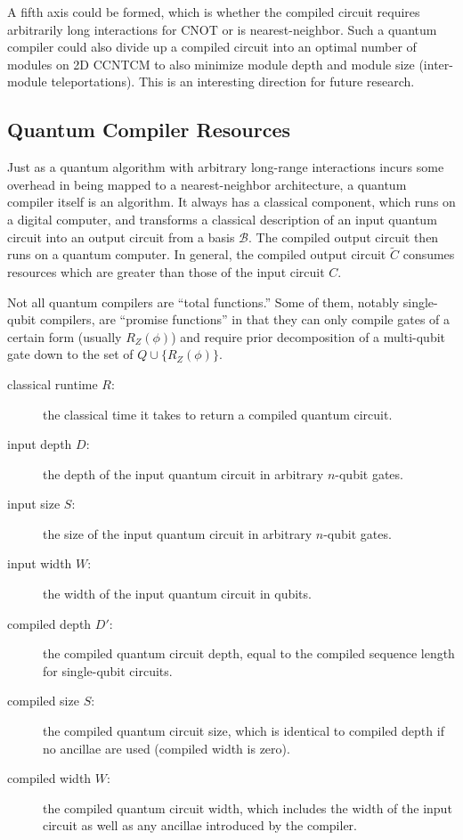 A fifth axis could be formed, which is whether the compiled circuit requires
arbitrarily long interactions for CNOT or is nearest-neighbor. Such a
quantum compiler could also divide up a compiled circuit into an optimal
number of modules on \textsf{2D CCNTCM} to also minimize module depth and
module size (inter-module teleportations). This is an interesting direction
for future research.

\subsection{Quantum Compiler Resources}

Just as a quantum algorithm with arbitrary long-range interactions incurs
some overhead in being mapped to a nearest-neighbor architecture,
a quantum compiler itself is an algorithm. It always has a classical
component, which runs on a digital computer, and transforms a classical
description of an input quantum circuit into an output circuit from
a basis $\mathcal{B}$. The compiled output circuit then runs on a
quantum computer. In general, the compiled output circuit $\tilde{C}$ consumes
resources which are greater than those of the input circuit $C$.

Not all quantum compilers are ``total functions.'' Some of them, notably
single-qubit compilers, are ``promise functions'' in that they can
only compile gates of a certain form (usually $R_Z(\phi)$) and require
prior decomposition of a multi-qubit gate down to the set of
$Q \cup \{R_Z(\phi)\}$.

\begin{description}
\item[classical runtime $R$:] the classical time it takes to return a 
compiled quantum circuit.
\item[input depth $D$:] the depth of the input quantum circuit in arbitrary
$n$-qubit gates.
\item[input size $S$:] the size of the input quantum circuit in arbitrary
$n$-qubit gates.
\item[input width $W$:] the width of the input quantum circuit in qubits.
\item[compiled depth $D'$:] the compiled quantum circuit depth, equal to
the compiled sequence length for single-qubit circuits.
\item[compiled size $S$:] the compiled quantum circuit size, which is
identical to compiled depth if no ancillae are used (compiled width is zero).
\item[compiled width $W$:] the compiled quantum circuit width, which includes
the width of the input circuit as well as any ancillae introduced by
the compiler.
\end{description}

